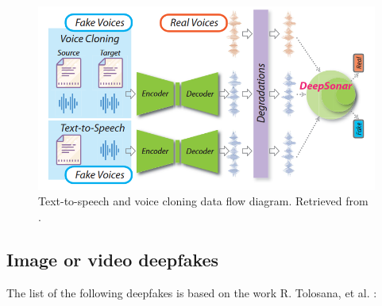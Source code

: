 \begin{figure}[H]
    \centering
    \includegraphics[width=.62\linewidth]{other-fig/tts_vc.png}        
    \caption{Text-to-speech and voice cloning data flow diagram. Retrieved from \cite{Deepsonar}.}
\label{fig:tts_vs}
\end{figure}

\subsection{Image or video deepfakes}

The list of the following deepfakes is based on the work R. Tolosana, et al. \cite{IntroductionToDigitalFaceManipulation}:

